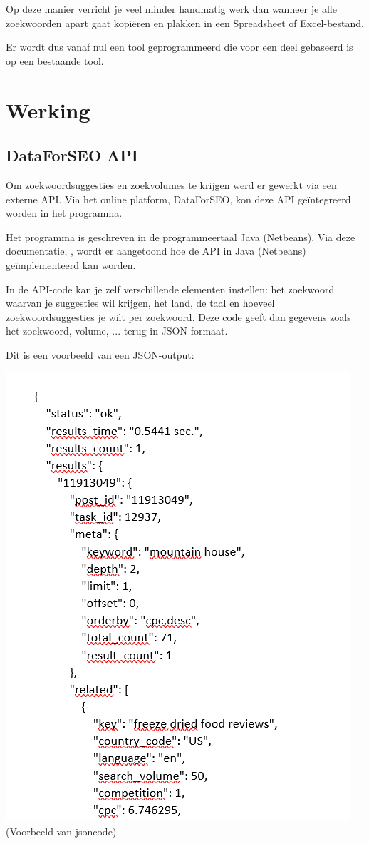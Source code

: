 Op deze manier verricht je veel minder handmatig werk dan wanneer je alle zoekwoorden apart gaat kopiëren en plakken in een Spreadsheet of Excel-bestand. 

Er wordt dus vanaf nul een tool geprogrammeerd die voor een deel gebaseerd is op een bestaande tool. 

\section{Werking}
\label{ch: Werking}

\subsection{DataForSEO API}
\label{ch: DataForSEO API}

Om zoekwoordsuggesties en zoekvolumes te krijgen werd er gewerkt via een externe API. Via het online platform, DataForSEO, kon deze API geïntegreerd worden in het programma. 

Het programma is geschreven in de programmeertaal Java (Netbeans). Via deze documentatie, \textcite{DATAFORSEO}, wordt er aangetoond hoe de API in Java (Netbeans) geïmplementeerd kan worden. 

In de API-code kan je zelf verschillende elementen instellen: het zoekwoord waarvan je suggesties wil krijgen, het land, de taal en hoeveel zoekwoordsuggesties je wilt per zoekwoord. Deze code geeft dan gegevens zoals het zoekwoord, volume, ... terug in JSON-formaat. 

Dit is een voorbeeld van een JSON-output: 

\includegraphics[width=\linewidth]{Bachelorproef/bachelor/img/jsoncode.PNG}
(Voorbeeld van jsoncode)           

